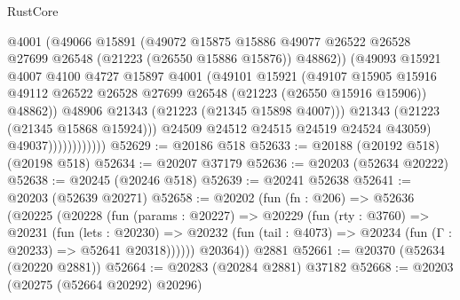 \begin{lexlean}{RustCore}
\begin{coremodule}
                                @4001
                                (@49066
                                  @15891
                                  (@49072
                                    @15875
                                    @15886
                                    @49077
                                    @26522
                                    @26528
                                    @27699
                                    @26548
                                    (@21223 (@26550 @15886 @15876))
                                    @48862))
                                (@49093
                                  @15921
                                  @4007
                                  @4100
                                  @4727
                                  @15897
                                  @4001
                                  (@49101
                                    @15921
                                    (@49107
                                      @15905
                                      @15916
                                      @49112
                                      @26522
                                      @26528
                                      @27699
                                      @26548
                                      (@21223 (@26550 @15916 @15906))
                                      @48862))
                                  @48906
                                  @21343
                                  (@21223 (@21345 @15898 @4007)))
                                @21343
                                (@21223 (@21345 @15868 @15924)))
                              @24509
                              @24512
                              @24515
                              @24519
                              @24524
                              @43059)
                            @49037))))))))))))
@52629 := @20186 @518
@52633 := @20188 (@20192 @518) (@20198 @518)
@52634 := @20207 @37179
@52636 := @20203 (@52634 @20222)
@52638 := @20245 (@20246 @518)
@52639 := @20241 @52638
@52641 := @20203 (@52639 @20271)
@52658 := @20202
    (fun (fn : @206) =>
    @52636
      (@20225
        (@20228
          (fun (params : @20227) =>
          @20229
            (fun (rty : @3760) =>
            @20231
              (fun (lets : @20230) =>
              @20232 (fun (tail : @4073) => @20234 (fun (Γ : @20233) => @52641 @20318))))))
        @20364))
    @2881
@52661 := @20370 (@52634 (@20220 @2881))
@52664 := @20283 (@20284 @2881) @37182
@52668 := @20203 (@20275 (@52664 @20292) @20296)

\end{coremodule}
\end{lexlean}
